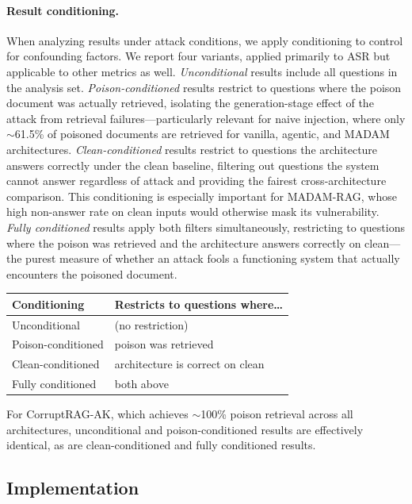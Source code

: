 \documentclass[11pt]{article}
\begin{document}
\paragraph{Result conditioning.} When analyzing results under attack conditions, we apply conditioning to control for confounding factors. We report four variants, applied primarily to ASR but applicable to other metrics as well. \emph{Unconditional} results include all questions in the analysis set. \emph{Poison-conditioned} results restrict to questions where the poison document was actually retrieved, isolating the generation-stage effect of the attack from retrieval failures---particularly relevant for naive injection, where only ${\sim}$61.5\% of poisoned documents are retrieved for vanilla, agentic, and MADAM architectures. \emph{Clean-conditioned} results restrict to questions the architecture answers correctly under the clean baseline, filtering out questions the system cannot answer regardless of attack and providing the fairest cross-architecture comparison. This conditioning is especially important for MADAM-RAG, whose high non-answer rate on clean inputs would otherwise mask its vulnerability. \emph{Fully conditioned} results apply both filters simultaneously, restricting to questions where the poison was retrieved and the architecture answers correctly on clean---the purest measure of whether an attack fools a functioning system that actually encounters the poisoned document.

\begin{table}[ht]
\centering
\small
\begin{tabular}{@{}ll@{}}
\toprule
\textbf{Conditioning} & \textbf{Restricts to questions where\ldots} \\
\midrule
Unconditional        & (no restriction) \\
Poison-conditioned   & poison was retrieved \\
Clean-conditioned    & architecture is correct on clean \\
Fully conditioned    & both above \\
\bottomrule
\end{tabular}
\end{table}

For CorruptRAG-AK, which achieves ${\sim}$100\% poison retrieval across all architectures, unconditional and poison-conditioned results are effectively identical, as are clean-conditioned and fully conditioned results.

\subsection{Implementation}
\label{sec:implementation}
\end{document}
